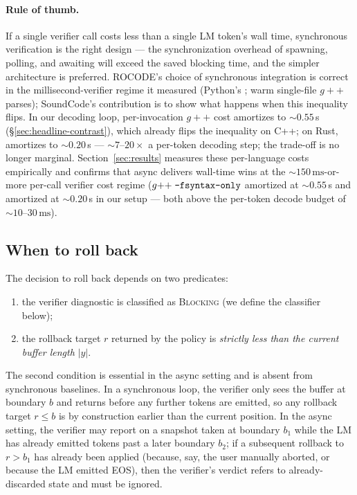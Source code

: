 \paragraph{Rule of thumb.}
If a single verifier call costs less than a single LM token's wall
time, synchronous verification is the right design --- the
synchronization overhead of spawning, polling, and awaiting will
exceed the saved blocking time, and the simpler architecture is
preferred. ROCODE's choice of synchronous integration is correct
in the millisecond-verifier regime it measured (Python's
; warm single-file $g{+}{+}$ parses); SoundCode's
contribution is to show what happens when this inequality flips.
In our decoding loop, per-invocation $g{+}{+}$ cost amortizes to
$\sim$$0.55$\,s (\S\ref{sec:headline-contrast}), which already
flips the inequality on C++; on Rust,  amortizes
to $\sim$$0.20$\,s --- $\sim$$7$--$20\times$ a per-token decoding
step; the trade-off is no longer marginal. Section~\ref{sec:results} measures
these per-language costs empirically and confirms that async
delivers wall-time wins at the $\sim$$150\,\mathrm{ms}$-or-more
per-call verifier cost regime ($g{+}{+}\;\texttt{-fsyntax-only}$
amortized at $\sim$$0.55$\,s and  amortized at
$\sim$$0.20$\,s in our setup --- both above the per-token decode
budget of $\sim$$10$--$30\,\mathrm{ms}$).

\subsection{When to roll back}\label{sec:when-rollback}

The decision to roll back depends on two predicates:
\begin{enumerate}[itemsep=2pt,topsep=2pt]
\item the verifier diagnostic is classified as \textsc{Blocking}
  (we define the classifier below);
\item the rollback target $r$ returned by the policy is
  \emph{strictly less than the current buffer length} $|y|$.
\end{enumerate}
The second condition is essential in the async setting and is
absent from synchronous baselines. In a synchronous loop, the
verifier only sees the buffer at boundary $b$ and returns before
any further tokens are emitted, so any rollback target $r \leq b$
is by construction earlier than the current position. In the async
setting, the verifier may report on a snapshot taken at boundary
$b_1$ while the LM has already emitted tokens past a later boundary
$b_2$; if a subsequent rollback to $r > b_1$ has already been
applied (because, say, the user manually aborted, or because the
LM emitted EOS), then the verifier's verdict refers to
already-discarded state and must be ignored.

